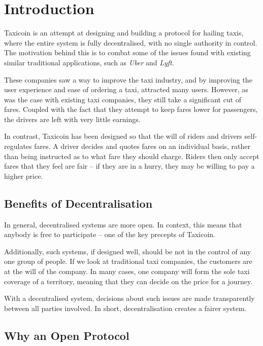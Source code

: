 \section{Introduction}

Taxicoin is an attempt at designing and building a protocol for hailing taxis, where the entire system is fully decentralised, with no single authority in control. The motivation behind this is to combat some of the issues found with existing similar traditional applications, such as \textit{Uber} and \textit{Lyft}.

These companies saw a way to improve the taxi industry, and by improving the user experience and ease of ordering a taxi, attracted many users. However, as was the case with existing taxi companies, they still take a significant cut of fares. Coupled with the fact that they attempt to keep fares lower for passengers, the drivers are left with very little earnings.

In contrast, Taxicoin has been designed so that the will of riders and drivers self-regulates fares. A driver decides and quotes fares on an individual basis, rather than being instructed as to what fare they should charge. Riders then only accept fares that they feel are fair -- if they are in a hurry, they may be willing to pay a higher price.

\subsection{Benefits of Decentralisation}

In general, decentralised systems are more open. In context, this means that anybody is free to participate -- one of the key precepts of Taxicoin.

Additionally, such systems, if designed well, should be not in the control of any one group of people. If we look at traditional taxi companies, the customers are at the will of the company. In many cases, one company will form the sole taxi coverage of a territory, meaning that they can decide on the price for a journey.

With a decentralised system, decisions about such issues are made transparently between all parties involved. In short, decentralisation creates a fairer system.

\subsection{Why an Open Protocol}

